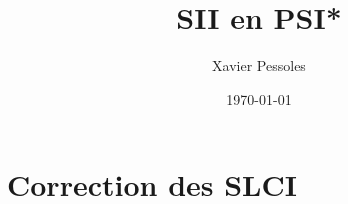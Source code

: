 \documentclass[
	fontsize=10pt, %
	twoside=true, %
]{kaobook}
\newcommand{\repRel}{../../..}
\newcommand{\repStyle}{\repRel/Style}
\begin{document}

\titlehead{Correction des SLCI}
\title[SII en PSI*]{SII en PSI*}
\author[XP]{Xavier Pessoles}
\date{\today}

%
\frontmatter %
%

%

%
\mainmatter %



\setcounter{margintocdepth}{\sectiontocdepth}
\marginlayout
\graphicspath{{\repStyle/png}}

\pagestyle{xp.scrheadings}


%



\newcommand{\repExo}{Application_01_ROV}
\newcommand{\nomExo}{Application_01_ROV}

\livrettrue %
\collefalse


\setcounter{chapter}{11}

\setchapterpreamble[u]{\margintoc}
\chapter{Correction des SLCI}

\normaltrue

\end{document}
